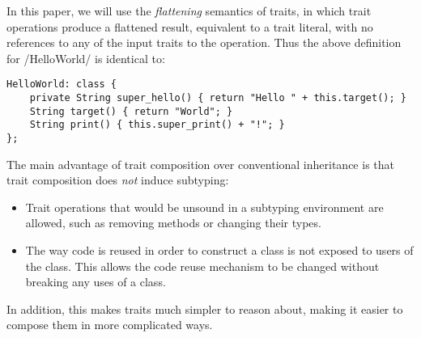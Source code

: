 In this paper, we will use the \emph{flattening} semantics of traits, in which trait operations produce a flattened result, equivalent to a trait literal, with no references to any of the input traits to the operation. Thus the above definition for /HelloWorld/ is identical to:
\begin{lstlisting}
HelloWorld: class {
	private String super_hello() { return "Hello " + this.target(); }
	String target() { return "World"; }
	String print() { this.super_print() + "!"; }
};
\end{lstlisting}

The main advantage of trait composition over conventional inheritance is that trait composition does \emph{not} induce subtyping:
\begin{itemize}
	\item Trait operations that would be unsound in a subtyping environment are allowed, such as removing methods or changing their types.
	\item The way code is reused in order to construct a class is not exposed to users of the class. This allows the code reuse mechanism to be changed without breaking any uses of a class.
\end{itemize}
In addition, this makes traits much simpler to reason about, making it easier to compose them in more complicated ways.